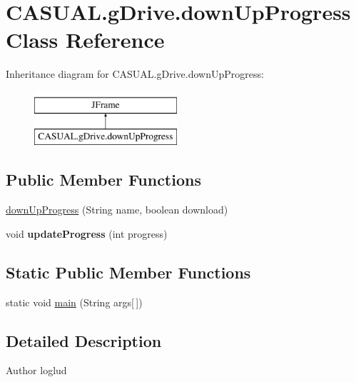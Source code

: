\hypertarget{classCASUAL_1_1gDrive_1_1downUpProgress}{\section{C\-A\-S\-U\-A\-L.\-g\-Drive.\-down\-Up\-Progress Class Reference}
\label{classCASUAL_1_1gDrive_1_1downUpProgress}
}
Inheritance diagram for C\-A\-S\-U\-A\-L.\-g\-Drive.\-down\-Up\-Progress\-:\begin{figure}[H]
\begin{center}
\leavevmode
\includegraphics[height=2.000000cm]{classCASUAL_1_1gDrive_1_1downUpProgress}
\end{center}
\end{figure}
\subsection*{Public Member Functions}
\begin{DoxyCompactItemize}
\item 
\hyperlink{classCASUAL_1_1gDrive_1_1downUpProgress_aace68e5af54d1bb957854705bd3aa9ed}{down\-Up\-Progress} (String name, boolean download)
\item 
\hypertarget{classCASUAL_1_1gDrive_1_1downUpProgress_a6a453b0639457ecd9a777a10b8f8f31c}{void {\bfseries update\-Progress} (int progress)}\label{classCASUAL_1_1gDrive_1_1downUpProgress_a6a453b0639457ecd9a777a10b8f8f31c}

\end{DoxyCompactItemize}
\subsection*{Static Public Member Functions}
\begin{DoxyCompactItemize}
\item 
static void \hyperlink{classCASUAL_1_1gDrive_1_1downUpProgress_a9c4dd83cfc683cf0575776ebf14dcaf7}{main} (String args\mbox{[}$\,$\mbox{]})
\end{DoxyCompactItemize}


\subsection{Detailed Description}
\begin{DoxyAuthor}{Author}
loglud 
\end{DoxyAuthor}


